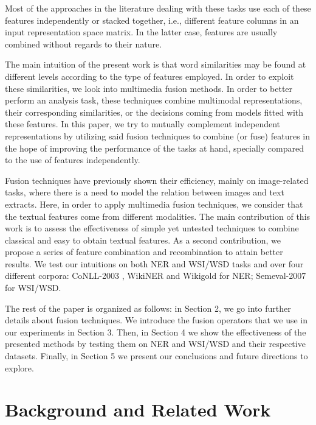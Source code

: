 \documentclass{llncs}
\begin{document}
Most of the approaches in the literature dealing with these tasks use each of these features independently or stacked together, i.e., different feature columns in an input representation space matrix. In the latter case, features are usually combined without regards to their nature. 

The main intuition of the present work is that word similarities may be found at different levels according to the type of features employed. In order to exploit these similarities, we look into multimedia fusion methods.  In order to better perform an analysis task, these techniques combine multimodal representations, their corresponding similarities, or the decisions coming from models fitted with these features. In this paper, we try to mutually complement independent representations by utilizing said fusion techniques to combine (or fuse) features in the hope of improving the performance of the tasks at hand, specially compared to the use of features independently. 

Fusion techniques have previously shown their efficiency, mainly on image-related tasks, where there is a need to model the relation  between images and text extracts.
%
%
Here, in order to apply multimedia fusion techniques, we consider that the textual features  come from different modalities. The main contribution of this work is to assess the effectiveness of simple yet untested techniques to combine classical and easy to obtain textual features. As a second contribution, we propose a series of feature combination and recombination to attain better results. We test our intuitions on both NER and WSI/WSD tasks and over four different corpora: CoNLL-2003 \cite{SangM03}, WikiNER and Wikigold \cite{Balasuriya2009} for NER; Semeval-2007 \cite{Agirre2007} for WSI/WSD.

The rest of the paper is organized as follows: in Section 2, we go into further details about fusion techniques. 
We introduce the fusion operators that we use in our experiments in Section 3. Then, in Section 4 we show the effectiveness of the presented methods by testing them on NER and WSI/WSD and their respective datasets. Finally, in Section 5 we present our conclusions and future directions to explore.

\section{Background and Related Work}
 
\end{document}
